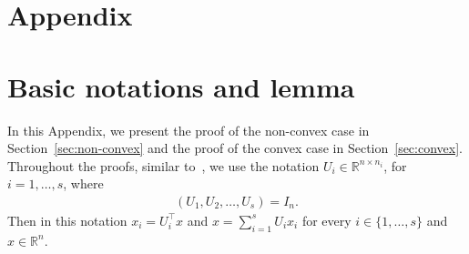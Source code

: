 \documentclass[11pt,a4paper]{article}
\numberwithin{equation}{section}%
\renewcommand{\(}{\left (}
\renewcommand{\)}{\right )}
\begin{document}




% 




\appendix

\section*{Appendix}\label{app:}

\section{Basic notations and lemma}
In this Appendix, we present the proof of the non-convex case in Section~\ref{sec:non-convex} and the proof of the convex case in Section~\ref{sec:convex}. Throughout the proofs, similar to~\cite{Nesterov2012EfficiencyOC}, we use the notation  $U_i \in \mathbb{R}^{n \times n_i} $, for $ i=1,\dots,s$, where 
\begin{align}\label{eq:def_Ui}
    (U_1, U_2, \dots, U_s) = I_n. 
\end{align}
Then in this notation $x_i = U_i^\top x$ and $x = \sum_{i=1}^s U_i x_i$ for every $i \in \{ 1, \dots, s\}$ and $x \in \mathbb{R}^n$.
\end{document}
